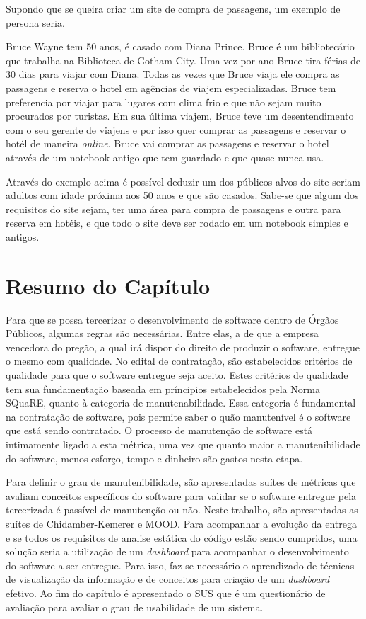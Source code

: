 Supondo que se queira criar um site de compra de passagens, um exemplo de persona seria. 

Bruce Wayne tem 50 anos, é casado com Diana Prince. Bruce é  um bibliotecário que trabalha na Biblioteca de Gotham City. Uma vez por ano Bruce tira férias de 30 dias para viajar com Diana. Todas as vezes que Bruce viaja ele compra as passagens e reserva o hotel em agências de viajem especializadas. Bruce tem preferencia por viajar para lugares com clima frio e que não sejam muito procurados por turistas. Em sua última viajem, Bruce teve um desentendimento com o seu gerente de viajens e por isso quer comprar as passagens e reservar o hotél de maneira \textit{online}. Bruce vai comprar as passagens e reservar o hotel através de um notebook antigo que tem guardado e que quase nunca usa.

Através do exemplo acima é possível deduzir um dos públicos alvos do site seriam adultos com idade próxima aos 50 anos e que são casados. Sabe-se que algum dos requisitos do site sejam, ter uma área para compra de passagens e outra para reserva em hotéis, e que todo o site deve ser rodado em um notebook simples e antigos.


\section{Resumo do Capítulo}
Para que se possa tercerizar o desenvolvimento de software dentro de Órgãos Públicos, algumas regras são necessárias. Entre elas, a de que a empresa vencedora do pregão, a qual irá dispor do direito de produzir o software, entregue o mesmo com qualidade. No edital de contratação, são estabelecidos critérios de qualidade para que o software entregue seja aceito. Estes critérios de qualidade tem sua fundamentação baseada em príncipios estabelecidos pela Norma SQuaRE, quanto à categoria de manutenabilidade. Essa categoria é fundamental na contratação de software, pois permite saber o quão manutenível é o software que está sendo contratado. O processo de manutenção de software está intimamente ligado a esta métrica, uma vez que quanto maior a manutenibilidade do software, menos esforço, tempo e dinheiro são gastos nesta etapa.

Para definir o grau de manutenibilidade, são apresentadas suítes de métricas que avaliam conceitos específicos do software para validar se o software entregue pela tercerizada é passível de manutenção ou não. Neste trabalho, são apresentadas as suítes de Chidamber-Kemerer e MOOD. Para acompanhar a evolução da entrega e se todos os requisitos de analise estática do código estão sendo cumpridos, uma solução seria a utilização de um \textit{dashboard} para acompanhar o desenvolvimento do software a ser entregue. Para isso, faz-se necessário o aprendizado de técnicas de visualização da informação e de conceitos para criação de um \textit{dashboard} efetivo. Ao fim do capítulo é apresentado o SUS que é um questionário de avaliação para avaliar o grau de usabilidade de um sistema.